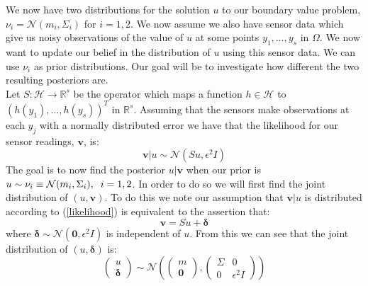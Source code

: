 \noindent We now have two distributions for the solution $u$ to our boundary value problem, $\nu_{i}=\mathcal{N}(m_i,\Sigma_{i})$ for $i=1,2$. We now assume we also have sensor data which give us noisy observations of the value of $u$ at some points $y_{1},\dots,y_{s}$ in $\Omega$. We now want to update our belief in the distribution of $u$ using this sensor data. We can use $\nu_{i}$ as prior distributions. Our goal will be to investigate how different the two resulting posteriors are. \\

Let $S:\mathcal{H}\rightarrow\mathbb{R}^{s}$ be the operator which maps a function $h\in\mathcal{H}$ to $(h(y_1),\dots,h(y_s))^{T}$ in $\mathbb{R}^{s}$. Assuming that the sensors make observations at each $y_j$ with a normally distributed error we have that the likelihood for our sensor readings, $\mathbf{v}$, is:
\begin{equation}
  \label{likelihood}
  \mathbf{v}|u \sim \mathcal{N}(Su,\epsilon^{2}I)
\end{equation}
The goal is to now find the posterior $u|\mathbf{v}$ when our prior is $u\sim\nu_{i}\equiv\mathcal{N}(m_{i},\Sigma_{i}), \hspace{0.2cm} i=1,2$. In order to do so we will first find the joint distribution of $(u,\mathbf{v})$. To do this we note our assumption that $\mathbf{v}|u$ is distributed according to (\ref{likelihood}) is equivalent to the assertion that:
\begin{equation*}
  \mathbf{v}=Su+\boldsymbol{\delta}
\end{equation*}
where $\boldsymbol{\delta}\sim\mathcal{N}(\mathbf{0},\epsilon^{2}I)$ is independent of $u$. From this we can see that the joint distribution of $(u,\boldsymbol{\delta})$ is:
\begin{equation*}
  \begin{pmatrix}
    u \\
    \boldsymbol{\delta}
  \end{pmatrix}\sim\mathcal{N}\left(\begin{pmatrix}
                                    m \\
                                    \mathbf{0}
                                    \end{pmatrix},
                                    \begin{pmatrix}
                                      \Sigma & 0 \\
                                      0 & \epsilon^{2}I
                                    \end{pmatrix}
                              \right)
\end{equation*}
